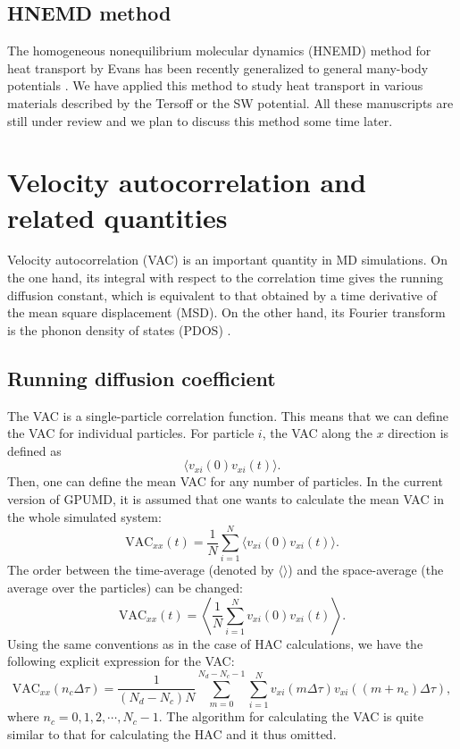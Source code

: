 \documentclass[12pt,a4paper]{report}
\begin{document}
\subsection{HNEMD method}

The homogeneous nonequilibrium molecular dynamics (HNEMD) method for heat transport by Evans \cite{evans1982pla} has been recently generalized to general many-body potentials \cite{fan2018submitted}. We have applied \cite{xu2018submitted,dong2018submitted} this method to study heat transport in various materials described by the Tersoff or the SW potential. All these manuscripts are still under review and we plan to discuss this method some time later.  

\section{Velocity autocorrelation and related quantities}

Velocity autocorrelation (VAC) is an important quantity in MD simulations. On the one hand, its integral with respect to the correlation time gives the running diffusion constant, which is equivalent to that obtained by a time derivative of the mean square displacement (MSD). On the other hand, its Fourier transform is the phonon density of states (PDOS) \cite{dickey1969pr}.

\subsection{Running diffusion coefficient}

The VAC is a single-particle correlation function. This means that we can define the VAC for individual particles. For particle $i$, the VAC along the $x$ direction is defined as
\begin{equation}
\langle v_{xi}(0) v_{xi}(t) \rangle.
\end{equation}
Then, one can define the mean VAC for any number of particles. In the current version of GPUMD, it is assumed that one wants to calculate the mean VAC in the whole simulated system:
\begin{equation}
\boxed{
\text{VAC}_{xx}(t) =
\frac{1}{N} \sum_{i=1}^{N} \langle v_{xi}(0) v_{xi}(t) \rangle
}.
\end{equation}
The order between the time-average (denoted by $\langle \rangle$) and the space-average (the average over the particles) can be changed:
\begin{equation}
\boxed{
\text{VAC}_{xx}(t) =
\left\langle \frac{1}{N} \sum_{i=1}^{N}  v_{xi}(0) v_{xi}(t) \right\rangle
}.
\end{equation}
Using the same conventions as in the case of HAC calculations, we have
the following explicit expression for the VAC:
\begin{equation}
\label{equation:VAC}
\text{VAC}_{xx}(n_c\Delta \tau) = \frac{1}{(N_d-N_c)N}
\sum_{m=0}^{N_d-N_c-1} \sum_{i=1}^{N}
v_{xi}(m\Delta \tau) v_{xi}((m+n_c)\Delta \tau),
\end{equation}
where $n_c = 0, 1, 2, \cdots, N_c-1$.
The algorithm for calculating the VAC is quite similar to that for calculating the HAC and it thus omitted.
\end{document}
